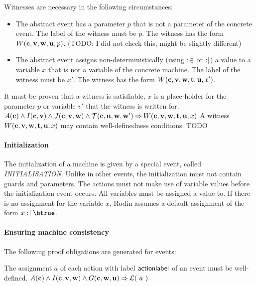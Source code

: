 Witnesses are necessary in the following circumstances:
\begin{itemize}
\item The abstract event has a parameter $p$ that is not a parameter of the concrete
  event.
  The label of the witness must be $p$.
  The witness has the form $W(\mathbf{c},{\mathbf{v},\mathbf{w}},\mathbf{u},p)$.
  (TODO: I did not check this, might be slightly different)
\item The abstract event assigns non-deterministically (using $\mathrel{:\mkern1mu\in}$ or $\mathrel{:\mkern1mu\mid}$) 
  a value to a variable $x$ that is not a variable of the concrete machine.
  The label of the witness must be $x'$.
  The witness has the form $W(\mathbf{c},{\mathbf{v},\mathbf{w}},{\mathbf{t},\mathbf{u}},x')$.
\end{itemize}

It must be proven that a witness is satisfiable, $x$ is a place-holder for the parameter $p$
  or variable $v'$ that the witness is written for.
%
  {$A(\mathbf{c}) \land I(\mathbf{c},\mathbf{v}) \land J(\mathbf{c},{\mathbf{v},\mathbf{w}}) \land
    \mathcal{T}(\mathbf{c},\mathbf{u},\mathbf{w},\mathbf{w}') \mathbin\Rightarrow
    W(\mathbf{c},{\mathbf{v},\mathbf{w}},{\mathbf{t},\mathbf{u}},x)$}
A witness $W(\mathbf{c},{\mathbf{v},\mathbf{w}},{\mathbf{t},\mathbf{u}},x)$ may contain well-definedness conditions.
%
  {TODO}

\paragraph{Initialization}
The initialization of a machine is given by a special event, called \textsl{INITIALISATION}.
Unlike in other events, the initialization must not contain guards and parameters.
The actions must not make use of variable values before the initialization event occurs.
All variables must be assigned a value to. If there is no assignment for the variable $x$,
Rodin assumes a default assignment of the form $x\bcmsuch \btrue$.

\paragraph{Ensuring machine consistency}
\label{consistency_proof_obligations}
The following proof obligations are generated for events:

The assignment $a$ of each action with label $\textsf{actionlabel}$ of an event must be well-defined.
  {}%
  {$A(\allconstants) \land I(\allconstants,\allvariables) \land G(\allconstants,\concvariables,\concparameters) \limp %
    \wdl(~a~)$}
  
